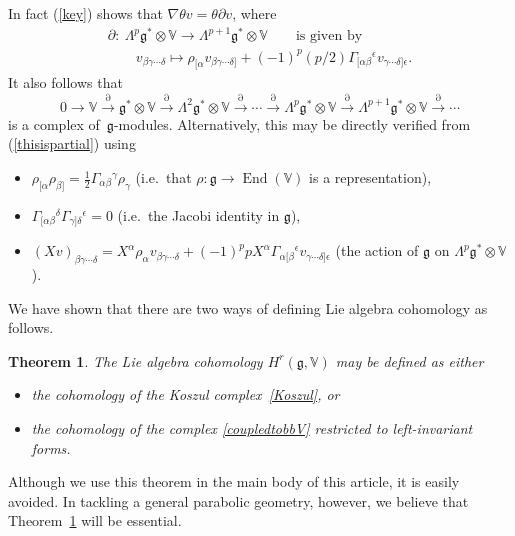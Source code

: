 \documentclass[11pt]{article}
\newtheorem{theorem}{Theorem}
\newcommand{\End}{\operatorname{End}}
\begin{document}
In fact (\ref{key}) shows that $\nabla\theta v=\theta\partial v$, where
\begin{gather}
\partial: \ \Lambda^p{\mathfrak{g}}^*\otimes{\mathbb{V}}\to
\Lambda^{p+1}{\mathfrak{g}}^*\otimes{\mathbb{V}}
\qquad\mbox{is given by}\nonumber\\
\qquad
v_{\beta\gamma\cdots\delta}\mapsto\rho_{[\alpha}v_{\beta\gamma\cdots\delta]}
+(-1)^p(p/2)\Gamma_{[\alpha\beta}{}^\epsilon v_{\gamma\cdots\delta]\epsilon}.\label{thisispartial}
\end{gather}
It also follows that
\begin{equation}\label{Koszul}
0\to{\mathbb{V}}\stackrel{\partial}{\longrightarrow}
{\mathfrak{g}}^*\otimes{\mathbb{V}}\stackrel{\partial}{\longrightarrow}
\Lambda^2{\mathfrak{g}}^*\otimes{\mathbb{V}}
\stackrel{\partial}{\longrightarrow}\cdots\stackrel{\partial}{\longrightarrow}
\Lambda^p{\mathfrak{g}}^*\otimes{\mathbb{V}}
\stackrel{\partial}{\longrightarrow}
\Lambda^{p+1}{\mathfrak{g}}^*\otimes{\mathbb{V}}
\stackrel{\partial}{\longrightarrow}
\cdots\end{equation}
is a complex of~${\mathfrak{g}}$-modules. Alternatively, this may be directly
verif\/ied from (\ref{thisispartial}) using
\begin{itemize}\itemsep=0pt
\item
$\rho_{[\alpha}\rho_{\beta]}=\frac12\Gamma_{\alpha\beta}{}^\gamma\rho_\gamma$
(i.e.~that $\rho:{\mathfrak{g}}\to\End({\mathbb{V}})$ is a representation),
\item $\Gamma_{[\alpha\beta}{}^\delta\Gamma_{\gamma]\delta}{}^\epsilon=0$
(i.e.~the Jacobi identity in ${\mathfrak{g}}$),
\item $(Xv)_{\beta\gamma\cdots\delta}
=X^\alpha\rho_\alpha v_{\beta\gamma\cdots\delta}
+(-1)^ppX^\alpha\Gamma_{\alpha[\beta}{}^\epsilon
v_{\gamma\cdots\delta]\epsilon}$ (the action of ${\mathfrak{g}}$ on
$\Lambda^p{\mathfrak{g}}^*\otimes{\mathbb{V}}$).
\end{itemize}
We have shown that there are two ways of def\/ining Lie algebra cohomology as
follows.
\begin{theorem}\label{geometricrealisation} The Lie algebra cohomology
$H^r({\mathfrak{g}},{\mathbb{V}})$ may be defined as either
\begin{itemize}\itemsep=0pt
\item the cohomology of the Koszul complex~\eqref{Koszul}, or
\item the cohomology of the complex \eqref{coupledtobbV} restricted to
left-invariant forms.
\end{itemize}
\end{theorem}
\begin{remark} Although we use this theorem in the main body of this article,
it is easily avoided. In tackling a general parabolic geometry,
however, we believe that Theorem~\ref{geometricrealisation} will be essential.
\end{remark}
\end{document}
